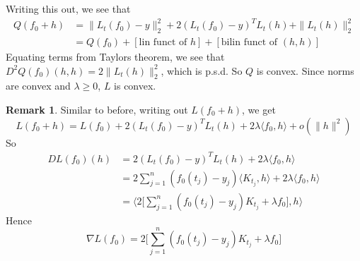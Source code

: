 \documentclass[notheorems]{beamer}
\theoremstyle{definition}
\theoremstyle{definition}
\newtheorem{rem}[definition]{Remark}
\newcommand{\lam}{\lambda}
\renewcommand{\r}{\rangle}
\renewcommand{\l}{\langle}
\begin{document}
\begin{frame}
Writing this out, we see that 
\begin{align*}
Q(f_0 + h) 
&= \|L_t(f_0) - y\|_2^2  + 2(L_t(f_0) - y)^T L_t(h) + \|L_t(h)\|_2^2 \\
&= Q(f_0) + [\text{lin funct of $h$}] +  [\text{bilin funct of $(h,h)$}]
\end{align*}
\pause
Equating terms from Taylors theorem, we see that $D^2Q(f_0)(h,h) = 2\|L_t(h)\|_2^2$, which is p.s.d. So $Q$ is convex. Since norms are convex and $\lam \geq 0$, $L$ is convex. 
\end{frame}














\begin{frame}
\begin{rem}
Similar to before, writing out $L(f_0 + h)$, we get
$$L(f_0 + h) = L(f_0) + 2(L_t(f_0) - y)^T L_t(h) + 2 \lam \l f_0 , h\r + o(\|h\|^2) $$
\pause
So 
\begin{align*}
DL(f_0)(h) 
&= 2(L_t(f_0) - y)^T L_t(h) + 2 \lam \l f_0 , h\r \\
&= 2\sum_{j=1}^n (f_0(t_j)- y_j) \l K_{t_j}, h\r +  2 \lam \l f_0 , h\r \\
&= \bigg \l  2\bigg [ \sum_{j=1}^n (f_0(t_j)- y_j) K_{t_j} + \lam f_0\bigg ] , h \bigg \r 
\end{align*}
\pause
Hence $$\nabla L(f_0) = 2\bigg [ \sum_{j=1}^n (f_0(t_j)- y_j) K_{t_j} + \lam f_0\bigg ]$$
\end{rem}
\end{frame}
\end{document}

